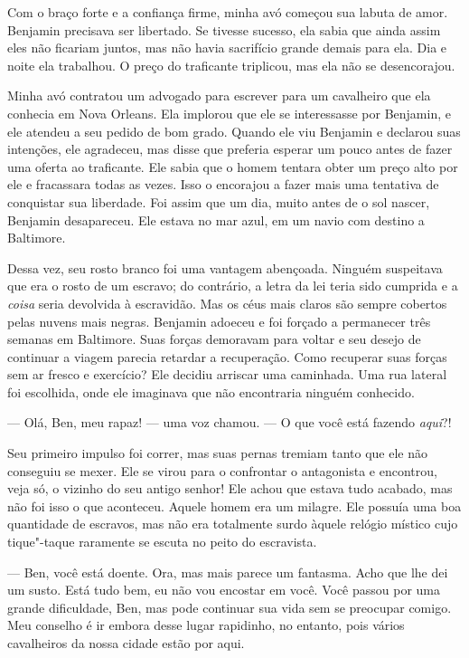 Com o braço forte e a confiança firme,
minha avó começou sua labuta de amor. Benjamin precisava ser libertado.
Se tivesse sucesso, ela sabia que ainda assim eles não ficariam juntos,
mas não havia sacrifício grande demais para ela. Dia e noite ela
trabalhou. O preço do traficante triplicou, mas ela não se desencorajou.

Minha avó contratou um advogado para
escrever para um cavalheiro que ela conhecia em Nova Orleans. Ela
implorou que ele se interessasse por Benjamin, e ele atendeu a seu
pedido de bom grado. Quando ele viu Benjamin e declarou suas intenções,
ele agradeceu, mas disse que preferia esperar um pouco antes de fazer
uma oferta ao traficante. Ele sabia que o homem tentara obter um preço
alto por ele e fracassara todas as vezes. Isso o encorajou a fazer mais
uma tentativa de conquistar sua liberdade. Foi assim que um dia, muito
antes de o sol nascer, Benjamin desapareceu. Ele estava no mar azul, em
um navio com destino a Baltimore.

Dessa vez, seu rosto branco foi uma
vantagem abençoada. Ninguém suspeitava que era o rosto de um escravo; do
contrário, a letra da lei teria sido cumprida e a \emph{coisa} seria
devolvida à escravidão. Mas os céus mais claros são sempre cobertos
pelas nuvens mais negras. Benjamin adoeceu e foi forçado a permanecer
três semanas em Baltimore. Suas forças demoravam para voltar e seu
desejo de continuar a viagem parecia retardar a recuperação. Como
recuperar suas forças sem ar fresco e exercício? Ele decidiu arriscar
uma caminhada. Uma rua lateral foi escolhida, onde ele imaginava que não
encontraria ninguém conhecido.

--- Olá, Ben, meu rapaz! --- uma voz chamou. --- O que você está fazendo
\emph{aqui}?!

Seu primeiro impulso foi correr, mas
suas pernas tremiam tanto que ele não conseguiu se mexer. Ele se virou
para o confrontar o antagonista e encontrou, veja só, o vizinho do seu
antigo senhor! Ele achou que estava tudo acabado, mas não foi isso o que
aconteceu. Aquele homem era um milagre. Ele possuía uma boa quantidade
de escravos, mas não era totalmente surdo àquele relógio místico cujo
tique"-taque raramente se escuta no peito do escravista.

--- Ben, você está doente. Ora, mas
mais parece um fantasma. Acho que lhe dei um susto. Está tudo bem, eu
não vou encostar em você. Você passou por uma grande dificuldade, Ben,
mas pode continuar sua vida sem se preocupar comigo. Meu conselho é ir
embora desse lugar rapidinho, no entanto, pois vários cavalheiros da
nossa cidade estão por aqui.


